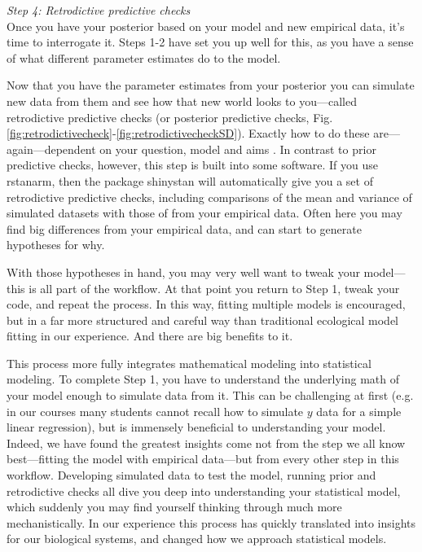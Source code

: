 \documentclass[11pt]{article}
\begin{document}
{\emph{Step 4: Retrodictive predictive checks} \\
Once you have your posterior based on your model and new empirical data, it's time to interrogate it. Steps 1-2 have set you up well for this, as you have a sense of what different parameter estimates do to the model. 

Now that you have the parameter estimates from your posterior you can simulate new data from them and see how that new world looks to you---called retrodictive predictive checks (or posterior predictive checks, Fig. \ref{fig:retrodictivecheck}-\ref{fig:retrodictivecheckSD}). Exactly how to do these are---again---dependent on your question, model and aims \citep[but there is lots written on this,][]{held2010,gelman200ppc,conn2018}. In contrast to prior predictive checks, however, this step is built into some software. If you use \textsf{rstanarm}, then the package \textsf{shinystan} will automatically give you a set of retrodictive predictive checks, including comparisons of the mean and variance of simulated datasets with those of from your empirical data. Often here you may find big differences from your empirical data, and can start to generate hypotheses for why.

With those hypotheses in hand, you may very well want to tweak your model---this is all part of the workflow. At that point you return to Step 1, tweak your code, and repeat the process. In this way, fitting multiple models is encouraged, but in a far more structured and careful way than traditional ecological model fitting in our experience. And there are big benefits to it. %

This process more fully integrates mathematical modeling into statistical modeling. To complete Step 1, you have to understand the underlying math of your model enough to simulate data from it. This can be challenging at first (e.g. in our courses many students cannot recall how to simulate $y$ data for a simple linear regression), but is immensely beneficial to understanding your model. Indeed, we have found the greatest insights come not from the step we all know best---fitting the model with empirical data---but from every other step in this workflow. Developing simulated data to test the model, running prior and retrodictive checks all dive you deep into understanding your statistical model, which suddenly you may find yourself thinking through much more mechanistically. In our experience this process has quickly translated into insights for our biological systems, and changed how we approach statistical models. 

}
\end{document}
